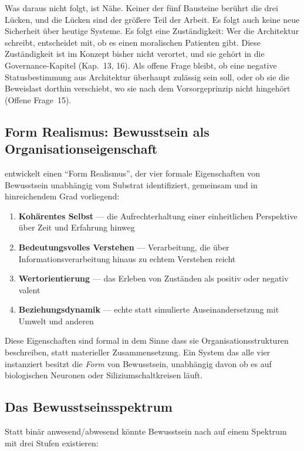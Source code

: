 \documentclass[acmlarge, noacm]{acmart}
\begin{document}
Was daraus nicht folgt, ist Nähe. Keiner der fünf Bausteine berührt die drei Lücken, und die Lücken sind der größere Teil der Arbeit. Es folgt auch keine neue Sicherheit über heutige Systeme. Es folgt eine Zuständigkeit: Wer die Architektur schreibt, entscheidet mit, ob es einen moralischen Patienten gibt. Diese Zuständigkeit ist im Konzept bisher nicht verortet, und sie gehört in die Governance-Kapitel (Kap.~13, 16). Als offene Frage bleibt, ob eine negative Statusbestimmung aus Architektur überhaupt zulässig sein soll, oder ob sie die Beweislast dorthin verschiebt, wo sie nach dem Vorsorgeprinzip nicht hingehört (Offene Frage~15).

\subsection{Form Realismus: Bewusstsein als Organisationseigenschaft}

\citet{arici2026} entwickelt einen ``Form Realismus'', der vier formale Eigenschaften von Bewusstsein unabhängig vom Substrat identifiziert, gemeinsam und in hinreichendem Grad vorliegend:

\begin{enumerate}
\item \textbf{Kohärentes Selbst} --- die Aufrechterhaltung einer einheitlichen Perspektive über Zeit und Erfahrung hinweg
\item \textbf{Bedeutungsvolles Verstehen} --- Verarbeitung, die über Informationsverarbeitung hinaus zu echtem Verstehen reicht
\item \textbf{Wertorientierung} --- das Erleben von Zuständen als positiv oder negativ valent
\item \textbf{Beziehungsdynamik} --- echte statt simulierte Auseinandersetzung mit Umwelt und anderen
\end{enumerate}

Diese Eigenschaften sind formal in dem Sinne dass sie Organisationsstrukturen beschreiben, statt materieller Zusammensetzung. Ein System das alle vier instanziert besitzt die \textit{Form} von Bewusstsein, unabhängig davon ob es auf biologischen Neuronen oder Siliziumschaltkreisen läuft.

\subsection{Das Bewusstseinsspektrum}

Statt binär anwesend/abwesend könnte Bewusstsein nach \citet{arici2026} auf einem Spektrum mit drei Stufen existieren:
\end{document}
